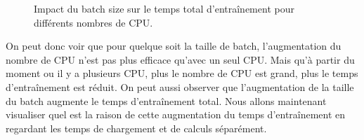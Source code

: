 \documentclass{rapportClass} %
\begin{document}
\begin{figure}[H]
    \caption{Impact du batch size sur le temps total d'entraînement pour différents nombres de CPU.}
\end{figure}
On peut donc voir que pour quelque soit la taille de batch, l'augmentation du nombre de CPU n'est pas plus efficace qu'avec un seul CPU.
Mais qu'à partir du moment ou il y a plusieurs CPU, plus le nombre de CPU est grand, plus le temps d'entraînement est réduit.
On peut aussi observer que l'augmentation de la taille du batch augmente le temps d'entraînement total.
Nous allons maintenant visualiser quel est la raison de cette augmentation du temps d'entraînement en regardant les temps de chargement et de calculs séparément.
\end{document}
